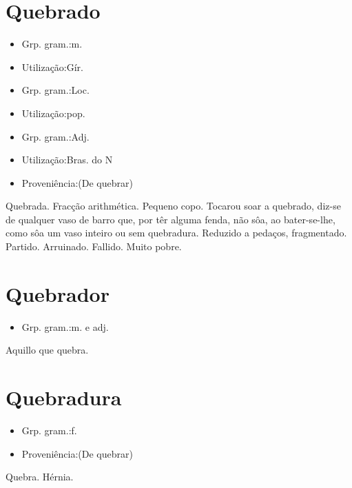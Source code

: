 \section{Quebrado}
\begin{itemize}
\item {Grp. gram.:m.}
\end{itemize}
\begin{itemize}
\item {Utilização:Gír.}
\end{itemize}
\begin{itemize}
\item {Grp. gram.:Loc.}
\end{itemize}
\begin{itemize}
\item {Utilização:pop.}
\end{itemize}
\begin{itemize}
\item {Grp. gram.:Adj.}
\end{itemize}
\begin{itemize}
\item {Utilização:Bras. do N}
\end{itemize}
\begin{itemize}
\item {Proveniência:(De \textunderscore quebrar\textunderscore )}
\end{itemize}
Quebrada.
Fracção arithmética.
Pequeno copo.
\textunderscore Tocar\textunderscore  ou \textunderscore soar a quebrado\textunderscore , diz-se de qualquer vaso de barro que, por têr alguma fenda, não sôa, ao bater-se-lhe, como sôa um vaso inteiro ou sem quebradura.
Reduzido a pedaços, fragmentado.
Partido.
Arruinado.
Fallido.
Muito pobre.
\section{Quebrador}
\begin{itemize}
\item {Grp. gram.:m.  e  adj.}
\end{itemize}
Aquillo que quebra.
\section{Quebradura}
\begin{itemize}
\item {Grp. gram.:f.}
\end{itemize}
\begin{itemize}
\item {Proveniência:(De \textunderscore quebrar\textunderscore )}
\end{itemize}
Quebra.
Hérnia.
